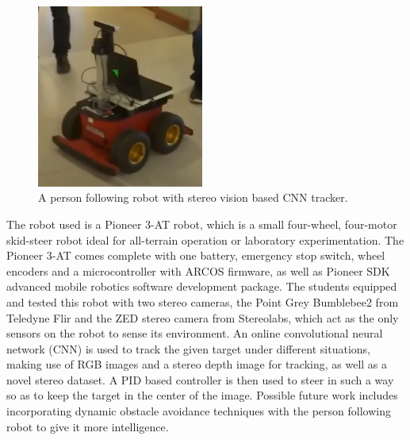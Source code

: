 \begin{figure}[!ht]
    \centering
    \includegraphics[height=60mm]{graphics/preson-following-robot.png}
    \caption{A person following robot with stereo vision based CNN tracker\cite{raghavender_sahdev_person_2017}.}
    \label{fig:follow-robot}
\end{figure}

The robot used is a Pioneer 3-AT robot, which is a small four-wheel, four-motor skid-steer robot ideal for all-terrain operation or laboratory experimentation. The Pioneer 3-AT comes complete with one battery, emergency stop switch, wheel encoders and a microcontroller with ARCOS firmware, as well as Pioneer SDK advanced mobile robotics software development package. 
The students equipped and tested this robot with two stereo cameras, the Point Grey Bumblebee2 from Teledyne Flir and the ZED stereo camera from Stereolabs, which act as the only sensors on the robot to sense its environment.
An online convolutional neural network (CNN) is used to track the given target under different situations, making use of RGB images and a stereo depth image for tracking, as well as a novel stereo dataset. A PID based controller is then used to steer in such a way so as to keep the target in the center of the image.
Possible future work includes incorporating dynamic obstacle avoidance
techniques with the person following robot to give it more intelligence.
